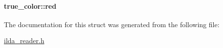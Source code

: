 \paragraph[{\texorpdfstring{red}{red}}]{ true\+\_\+color\+::red}\hypertarget{structtrue__color_a8840e16b209c4cfaf42737d2ee98d8a0}{}\label{structtrue__color_a8840e16b209c4cfaf42737d2ee98d8a0}


The documentation for this struct was generated from the following file\+:\begin{DoxyCompactItemize}
\item 
\hyperlink{ilda__reader_8h}{ilda\+\_\+reader.\+h}\end{DoxyCompactItemize}
